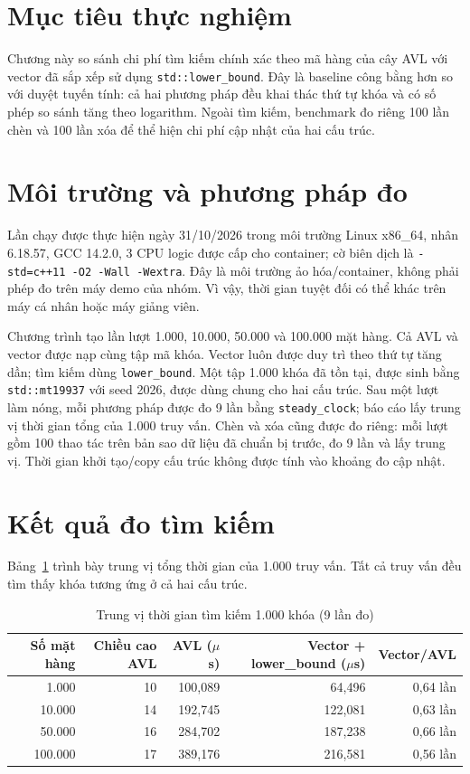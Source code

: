 \section{Mục tiêu thực nghiệm}
Chương này so sánh chi phí tìm kiếm chính xác theo mã hàng của cây AVL với vector đã sắp xếp sử dụng \texttt{std::lower\_bound}. Đây là baseline công bằng hơn so với duyệt tuyến tính: cả hai phương pháp đều khai thác thứ tự khóa và có số phép so sánh tăng theo logarithm. Ngoài tìm kiếm, benchmark đo riêng 100 lần chèn và 100 lần xóa để thể hiện chi phí cập nhật của hai cấu trúc.

\section{Môi trường và phương pháp đo}
Lần chạy được thực hiện ngày 31/10/2026 trong môi trường Linux x86\_64, nhân 6.18.57, GCC 14.2.0, 3 CPU logic được cấp cho container; cờ biên dịch là \texttt{-std=c++11 -O2 -Wall -Wextra}. Đây là môi trường ảo hóa/container, không phải phép đo trên máy demo của nhóm. Vì vậy, thời gian tuyệt đối có thể khác trên máy cá nhân hoặc máy giảng viên.

Chương trình tạo lần lượt 1.000, 10.000, 50.000 và 100.000 mặt hàng. Cả AVL và vector được nạp cùng tập mã khóa. Vector luôn được duy trì theo thứ tự tăng dần; tìm kiếm dùng \texttt{lower\_bound}. Một tập 1.000 khóa đã tồn tại, được sinh bằng \texttt{std::mt19937} với seed 2026, được dùng chung cho hai cấu trúc. Sau một lượt làm nóng, mỗi phương pháp được đo 9 lần bằng \texttt{steady\_clock}; báo cáo lấy trung vị thời gian tổng của 1.000 truy vấn. Chèn và xóa cũng được đo riêng: mỗi lượt gồm 100 thao tác trên bản sao dữ liệu đã chuẩn bị trước, đo 9 lần và lấy trung vị. Thời gian khởi tạo/copy cấu trúc không được tính vào khoảng đo cập nhật.

\section{Kết quả đo tìm kiếm}
Bảng~\ref{tab:benchmark_search} trình bày trung vị tổng thời gian của 1.000 truy vấn. Tất cả truy vấn đều tìm thấy khóa tương ứng ở cả hai cấu trúc.

\begin{table}[H]
\centering
\caption{Trung vị thời gian tìm kiếm 1.000 khóa (9 lần đo)}
\label{tab:benchmark_search}
\small
\begin{tabular}{@{}rrrrr@{}}
\toprule
\textbf{Số mặt hàng} & \textbf{Chiều cao AVL} & \textbf{AVL ($\mu$s)} & \textbf{Vector + lower\_bound ($\mu$s)} & \textbf{Vector/AVL} \\
\midrule
1.000   & 10 & 100,089 & 64,496  & 0,64 lần \\
10.000  & 14 & 192,745 & 122,081 & 0,63 lần \\
50.000  & 16 & 284,702 & 187,238 & 0,66 lần \\
100.000 & 17 & 389,176 & 216,581 & 0,56 lần \\
\bottomrule
\end{tabular}
\end{table}

